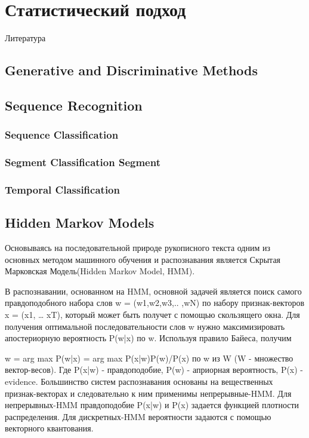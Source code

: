 \chapter{Статистический подход} \label{chapt3}

Литература \cite{шлезингер2004десять, bishop2006pattern, graves2013generating, graves2012supervised, murphy2012machine}

\section{Generative and Discriminative Methods} \label{sect3_1}

\section{Sequence Recognition} \label{sect3_2}


\subsection{Sequence Classification} \label{subsect3_2_1}
\subsection{Segment Classification Segment} \label{subsect3_2_1}
\subsection{Temporal Classification} \label{subsect3_2_1}

\section{Hidden Markov Models} \label{sect3_3}

Основываясь на последовательной природе рукописного текста одним из основных методом машинного обучения и распознавания является Скрытая Марковская Модель(Hidden Markov Model, HMM).

В распознавании, основанном на HMM, основной задачей является поиск самого правдоподобного набора слов w = (w1,w2,w3,.. ,wN) по набору признак-векторов x = (x1, … xT), который может быть получет с помощью скользящего окна.
Для получения оптимальной последовательности слов w нужно максимизировать апостериорную вероятность P(w|x) по w. Используя правило Байеса, получим

w = arg max P(w|x) = arg max P(x|w)P(w)/P(x) по w из W (W - множество вектор-весов).
Где P(x|w) - правдоподобие, P(w) - априорная вероятность, P(x) - evidence.
Большинство систем распознавания основаны на вещественных признак-векторах и следовательно к ним применимы непрерывные-HMM. Для непрерывных-HMM правдоподобие P(x|w) и P(x) задается функцией плотности распределения. Для дискретных-HMM вероятности задаются с помощью векторного квантования.

